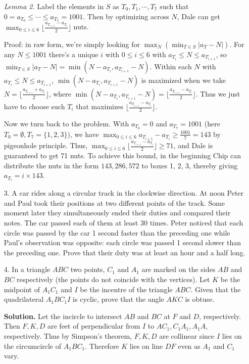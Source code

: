 \documentclass[11pt,a4paper]{article}
\begin{document}
\begin{enumerate}
	\emph{Lemma 2.} Label the elements in $S$ as 
	$T_0, T_1, \cdots, T_7$ such that $0=a_{T_0}\le \cdots \le a_{T_7}=1001$. 
	Then by optimizing across $N$, Dale can get $\max_{0\le i\le 6} \lfloor \frac{a_{T_{i+1}} - a_{T_i}}{2}\rfloor$
	nuts. 
	
	Proof: in raw form, we're simply looking for $\max_N(\min_{T\in S}|a_T-N|)$. 
	For any $N\le 1001$ there's a unique $i$ with $0\le i\le 6$ with $a_{T_i}\le N\le a_{T_{i+1}}$, 
	so $\min_{T\in S}|a_T-N|=\min (N-a_{T_i}, a_{T_{i+1}}-N)$. 
	Within each $N$ with $a_{T_i}\le N\le a_{T_{i+1}}$, 
	$\min (N-a_{T_i}, a_{T_{i+1}}-N)$ is maximized when we take 
	$N = \lfloor \frac{a_{T_{i+1}} + a_{T_i}}{2}\rfloor$, 
	where $\min (N-a_{T_i}, a_{T_{i+1}}-N)=\lfloor \frac{a_{T_{i+1}} - a_{T_i}}{2}\rfloor$. 
	Thus we just have to choose such $T_i$ that maximizes $\lfloor \frac{a_{T_{i+1}} - a_{T_i}}{2}\rfloor$. 
	
	Now we turn back to the problem. 
	With $a_{T_0}=0$ and $a_{T_7}=1001$ (here $T_0=\emptyset, T_7=\{1, 2, 3\}$), 
	we have $\max_{0\le i\le 6}a_{T_{i+1}} - a_{T_i}\ge \frac{1001}{7}=143$ by pigeonhole principle. 
	Thus, $\max_{0\le i\le 6} \lfloor \frac{a_{T_{i+1}} - a_{T_i}}{2}\rfloor\ge 71$, 
	and Dale is guaranteed to get 71 nuts. 
	To achieve this bound, 
	in the beginning Chip can distribute the nuts in the form $143, 286, 572$ to boxes 1, 2, 3, 
	thereby giving $a_{T_i}=i\times 143$. 
	
	\item [3.] 
	A car rides along a circular track in the clockwise direction. At noon Peter and Paul took
	their positions at two different points of the track. Some moment later they simultaneously
	ended their duties and compared their notes. The car passed each of them at least 30 times.
	Peter noticed that each circle was passed by the car 1 second faster than the preceding
	one while Paul’s observation was opposite: each circle was passed 1 second slower than the
	preceding one.
	Prove that their duty was at least an hour and a half long.
	
	\item [4.] 
	In a triangle $ABC$ two points, $C_1$ and $A_1$ are marked on the sides $AB$ and $BC$ respectively
	(the points do not coincide with the vertices). 
	Let $K$ be the midpoint of $A_1C_1$ and $I$ be the incentre of the triangle $ABC$. 
	Given that the quadrilateral $A_1BC_1I$ is cyclic, prove that the angle $AKC$ is obtuse.
	
	\textbf{Solution.} 
	Let the incircle to intersect $AB$ and $BC$ at $F$ and $D$, respectively. 
	Then $F, K, D$ are feet of perpendicular from $I$ to $AC_1, C_1A_1, A_1A$, respectively. 
	Thus by Simpson's theorem, $F, K, D$ are collinear since $I$ lies on the circumcircle of $A_1BC_1$. 
	Therefore $K$ lies on line $DF$ even as $A_1$ and $C_1$ vary. 
	

\end{enumerate}
\end{document}
